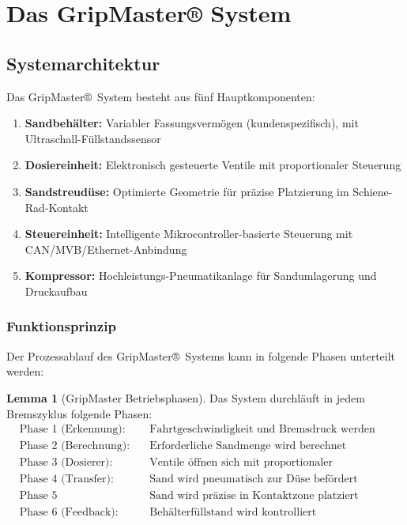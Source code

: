 \documentclass[a4paper,12pt]{article}
\theoremstyle{definition}
\newtheorem{lemma}{Lemma}
\theoremstyle{remark}
\begin{document}
\section{Das GripMaster® System}

\subsection{Systemarchitektur}

Das GripMaster®~System besteht aus fünf Hauptkomponenten:

\begin{enumerate}
	\item \textbf{Sandbehälter:} Variabler Fassungsvermögen (kundenspezifisch), mit Ultraschall-Füllstandssensor
	\item \textbf{Dosiereinheit:} Elektronisch gesteuerte Ventile mit proportionaler Steuerung
	\item \textbf{Sandstreudüse:} Optimierte Geometrie für präzise Platzierung im Schiene-Rad-Kontakt
	\item \textbf{Steuereinheit:} Intelligente Mikrocontroller-basierte Steuerung mit CAN/MVB/Ethernet-Anbindung
	\item \textbf{Kompressor:} Hochleistungs-Pneumatikanlage für Sandumlagerung und Druckaufbau
\end{enumerate}

\subsubsection{Funktionsprinzip}

Der Prozessablauf des GripMaster®~Systems kann in folgende Phasen unterteilt werden:

\begin{lemma}[GripMaster Betriebsphasen]
	Das System durchläuft in jedem Bremszyklus folgende Phasen:
	\begin{align*}
		&\text{Phase 1 (Erkennung):} && \text{Fahrtgeschwindigkeit und Bremsdruck werden erfasst} \\
		&\text{Phase 2 (Berechnung):} && \text{Erforderliche Sandmenge wird berechnet} \\
		&\text{Phase 3 (Dosierer):} && \text{Ventile öffnen sich mit proportionaler Charakteristik} \\
		&\text{Phase 4 (Transfer):} && \text{Sand wird pneumatisch zur Düse befördert} \\
		&\text{Phase 5 (Ausbringung):} && \text{Sand wird präzise in Kontaktzone platziert} \\
		&\text{Phase 6 (Feedback):} && \text{Behälterfüllstand wird kontrolliert}
	\end{align*}
\end{lemma}
\end{document}
